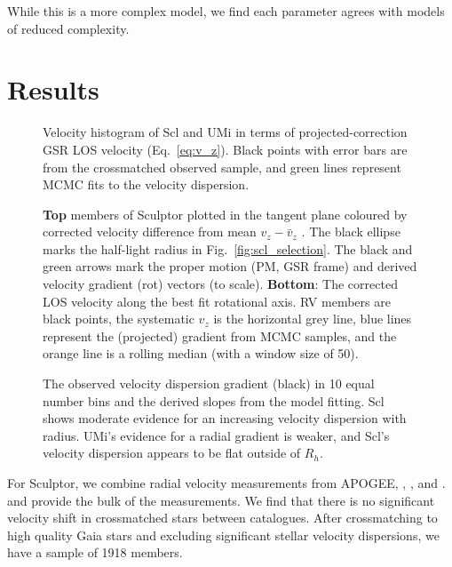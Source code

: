 While this is a more complex model, we find each parameter agrees with
models of reduced complexity.

\section{Results}\label{sec:rv_results}

\begin{figure}
\centering
{}
\caption[LOS velocity fit to Scl]{Velocity histogram of Scl and UMi in
terms of projected-correction GSR LOS velocity (Eq.~\ref{eq:v_z}). Black
points with error bars are from the crossmatched observed sample, and
green lines represent MCMC fits to the velocity dispersion.}
\end{figure}



\begin{figure}
\centering
{}
\caption[Scl velocity gradient]{\textbf{Top} members of Sculptor plotted
in the tangent plane coloured by corrected velocity difference from mean
\(v_z - \bar v_z\) . The black ellipse marks the half-light radius in
Fig.~\ref{fig:scl_selection}. The black and green arrows mark the proper
motion (PM, GSR frame) and derived velocity gradient (rot) vectors (to
scale). \textbf{Bottom}: The corrected LOS velocity along the best fit
rotational axis. RV members are black points, the systematic \(v_z\) is
the horizontal grey line, blue lines represent the (projected) gradient
from MCMC samples, and the orange line is a rolling median (with a
window size of 50).}\label{fig:scl_velocity_gradient_scatter}
\end{figure}

\begin{figure}
\centering
{}
\caption[Possible gradients in the velocity dispersion]{The observed
velocity dispersion gradient (black) in 10 equal number bins and the
derived slopes from the model fitting. Scl shows moderate evidence for
an increasing velocity dispersion with radius. UMi's evidence for a
radial gradient is weaker, and Scl's velocity dispersion appears to be
flat outside of \(R_h\).}
\end{figure}

For Sculptor, we combine radial velocity measurements from APOGEE,
\citet{sestito+2023a}, \citet{tolstoy+2023}, and \citet{WMO2009}.
\citet{tolstoy+2023} and \citet{WMO2009} provide the bulk of the
measurements. We find that there is no significant velocity shift in
crossmatched stars between catalogues. After crossmatching to high
quality Gaia stars and excluding significant stellar velocity
dispersions, we have a sample of 1918 members.

